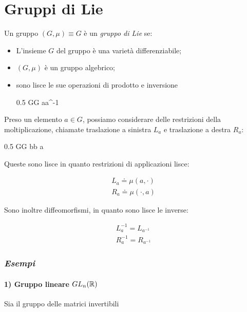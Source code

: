 \section{Gruppi di Lie}\label{sec:lie-groups}

Un gruppo $ (G,\mu) \equiv G $ è un \textit{gruppo di Lie} se:

\begin{itemize}
	\item L'insieme $ G $ del gruppo è una varietà differenziabile;
	
	\item $ (G,\mu) $ è un gruppo algebrico;
	
	\item sono lisce le sue operazioni di prodotto e inversione
	
		{0.5}{%
					{G}{G}
					{a}{a^{-1}}
				}
\end{itemize}
		
Preso un elemento $ a \in G $, possiamo considerare delle restrizioni della moltiplicazione, chiamate traslazione a sinistra $ L_{a} $ e traslazione a destra $ R_{a} $:

	{0.5}{%
				{G}{G}
				{b}{b a}
			}

Queste sono lisce in quanto restrizioni di applicazioni lisce:

\begin{gather}
	L_{a} \doteq \mu(a,\cdot) \\
	R_{a} \doteq \mu(\cdot,a) 
\end{gather}

Sono inoltre diffeomorfismi, in quanto sono lisce le inverse:

\begin{gather}
	L_{a}^{-1} = L_{a^{-1}} \\
	R_{a}^{-1} = R_{a^{-1}}
\end{gather}

\subsubsection{\textit{Esempi}}

\paragraph{1) Gruppo lineare $ GL_{n}(\mathbb{R}) $}

Sia il gruppo delle matrici invertibili

